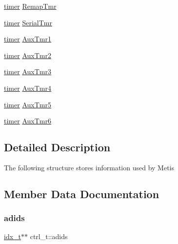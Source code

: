 \begin{DoxyCompactItemize}
\item 
\hyperlink{libparmetis_2struct_8h_aae821c36bb7e6918e1414484f939c3d4}{timer} \hyperlink{structctrl__t_a09be4dee7850678b5e247eba855786a8}{Remap\+Tmr}
\item 
\hyperlink{libparmetis_2struct_8h_aae821c36bb7e6918e1414484f939c3d4}{timer} \hyperlink{structctrl__t_aed0beddb0cbcc304b2473eb9b13f1ff4}{Serial\+Tmr}
\item 
\hyperlink{libparmetis_2struct_8h_aae821c36bb7e6918e1414484f939c3d4}{timer} \hyperlink{structctrl__t_a54b296cf8b956a9acda86b7525ae0dc2}{Aux\+Tmr1}
\item 
\hyperlink{libparmetis_2struct_8h_aae821c36bb7e6918e1414484f939c3d4}{timer} \hyperlink{structctrl__t_ab9675c12f7733edb2276c991d2634512}{Aux\+Tmr2}
\item 
\hyperlink{libparmetis_2struct_8h_aae821c36bb7e6918e1414484f939c3d4}{timer} \hyperlink{structctrl__t_af05e8d64a430f4a92993f28b894ab098}{Aux\+Tmr3}
\item 
\hyperlink{libparmetis_2struct_8h_aae821c36bb7e6918e1414484f939c3d4}{timer} \hyperlink{structctrl__t_a0a512f4bc4dab3b5106d2c4251d6c1fc}{Aux\+Tmr4}
\item 
\hyperlink{libparmetis_2struct_8h_aae821c36bb7e6918e1414484f939c3d4}{timer} \hyperlink{structctrl__t_abe3a6c54cd913122a281df4d0c069867}{Aux\+Tmr5}
\item 
\hyperlink{libparmetis_2struct_8h_aae821c36bb7e6918e1414484f939c3d4}{timer} \hyperlink{structctrl__t_a11d0309701b0ad399b7082b8e213ec6f}{Aux\+Tmr6}
\end{DoxyCompactItemize}


\subsection{Detailed Description}
The following structure stores information used by Metis 

\subsection{Member Data Documentation}
\mbox{\label{structctrl__t_a483d832bdceddc91d7a727ca32d35a8f}} 
\subsubsection{\texorpdfstring{adids}{adids}}
{\footnotesize\ttfamily \hyperlink{3rd_party_2parmetis-4_80_83_2metis_2include_2metis_8h_aaa5262be3e700770163401acb0150f52}{idx\+\_\+t}$\ast$$\ast$ ctrl\+\_\+t\+::adids}

